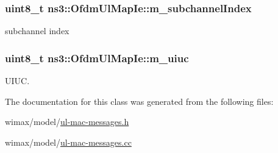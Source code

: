 \subsubsection[{\texorpdfstring{m\+\_\+subchannel\+Index}{m_subchannelIndex}}]{\setlength{\rightskip}{0pt plus 5cm}uint8\+\_\+t ns3\+::\+Ofdm\+Ul\+Map\+Ie\+::m\+\_\+subchannel\+Index\hspace{0.3cm}{\ttfamily [private]}}\hypertarget{classns3_1_1OfdmUlMapIe_a9d85926e578e48adc8e5b58ded98f3c7}{}\label{classns3_1_1OfdmUlMapIe_a9d85926e578e48adc8e5b58ded98f3c7}


subchannel index 

\subsubsection[{\texorpdfstring{m\+\_\+uiuc}{m_uiuc}}]{\setlength{\rightskip}{0pt plus 5cm}uint8\+\_\+t ns3\+::\+Ofdm\+Ul\+Map\+Ie\+::m\+\_\+uiuc\hspace{0.3cm}{\ttfamily [private]}}\hypertarget{classns3_1_1OfdmUlMapIe_ab87646027e885948ad1eaa60585191fc}{}\label{classns3_1_1OfdmUlMapIe_ab87646027e885948ad1eaa60585191fc}


U\+I\+UC. 



The documentation for this class was generated from the following files\+:\begin{DoxyCompactItemize}
\item 
wimax/model/\hyperlink{ul-mac-messages_8h}{ul-\/mac-\/messages.\+h}\item 
wimax/model/\hyperlink{ul-mac-messages_8cc}{ul-\/mac-\/messages.\+cc}\end{DoxyCompactItemize}
